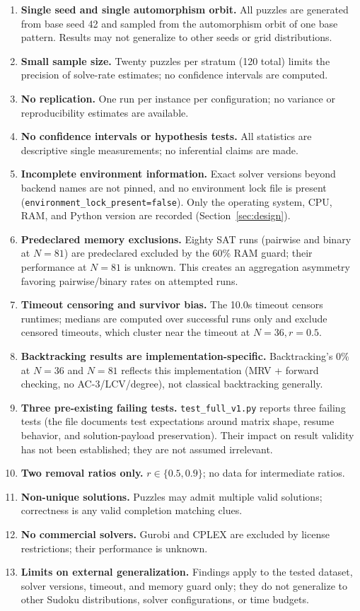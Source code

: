\documentclass[a4paper,fleqn]{cas-sc}
\newcommand{\code}[1]{\texttt{\nolinkurl{#1}}}
\begin{document}
\begin{enumerate}
    \item \textbf{Single seed and single automorphism orbit.} All puzzles are generated from base seed 42 and sampled from the automorphism orbit of one base pattern. Results may not generalize to other seeds or grid distributions.
    \item \textbf{Small sample size.} Twenty puzzles per stratum (120 total) limits the precision of solve-rate estimates; no confidence intervals are computed.
    \item \textbf{No replication.} One run per instance per configuration; no variance or reproducibility estimates are available.
    \item \textbf{No confidence intervals or hypothesis tests.} All statistics are descriptive single measurements; no inferential claims are made.
    \item \textbf{Incomplete environment information.} Exact solver versions beyond backend names are not pinned, and no environment lock file is present (\texttt{environment\_lock\_present=false}). Only the operating system, CPU, RAM, and Python version are recorded (Section~\ref{sec:design}).
    \item \textbf{Predeclared memory exclusions.} Eighty SAT runs (pairwise and binary at \(N=81\)) are predeclared excluded by the 60\% RAM guard; their performance at \(N=81\) is unknown. This creates an aggregation asymmetry favoring pairwise/binary rates on attempted runs.
    \item \textbf{Timeout censoring and survivor bias.} The 10.0s timeout censors runtimes; medians are computed over successful runs only and exclude censored timeouts, which cluster near the timeout at \(N=36, r=0.5\).
    \item \textbf{Backtracking results are implementation-specific.} Backtracking's 0\% at \(N=36\) and \(N=81\) reflects this implementation (MRV + forward checking, no AC-3/LCV/degree), not classical backtracking generally.
    \item \textbf{Three pre-existing failing tests.} \code{test_full_v1.py} reports three failing tests (the file documents test expectations around matrix shape, resume behavior, and solution-payload preservation). Their impact on result validity has not been established; they are not assumed irrelevant.
    \item \textbf{Two removal ratios only.} \(r \in \{0.5, 0.9\}\); no data for intermediate ratios.
    \item \textbf{Non-unique solutions.} Puzzles may admit multiple valid solutions; correctness is any valid completion matching clues.
    \item \textbf{No commercial solvers.} Gurobi and CPLEX are excluded by license restrictions; their performance is unknown.
    \item \textbf{Limits on external generalization.} Findings apply to the tested dataset, solver versions, timeout, and memory guard only; they do not generalize to other Sudoku distributions, solver configurations, or time budgets.
\end{enumerate}
\end{document}
